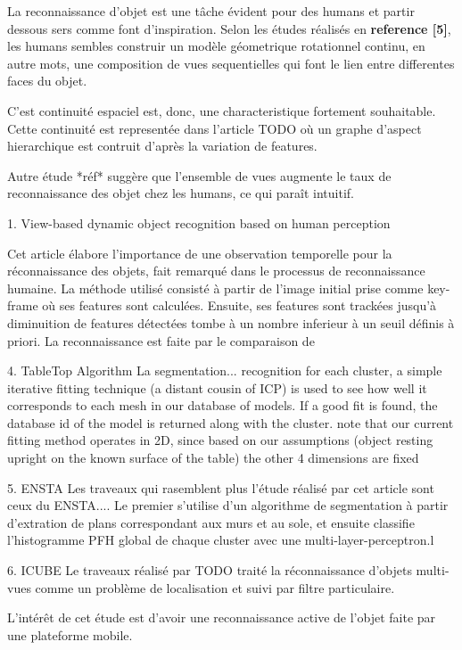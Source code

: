 La reconnaissance d'objet est une tâche évident pour des humans et partir dessous sers comme font d'inspiration.
Selon les études réalisés en \textbf{reference [5]}, les humans sembles construir un modèle géometrique rotationnel continu, en autre mots, une composition de vues sequentielles qui font le lien entre differentes faces du objet. 

C'est continuité espaciel est, donc, une characteristique fortement souhaitable. Cette continuité est representée dans l'article {\color{red} TODO} où un graphe d'aspect hierarchique est contruit d'après la variation de features. 

Autre étude *réf* suggère que l'ensemble de vues augmente le taux de reconnaissance des objet chez les humans, ce qui paraît intuitif.


1. View-based dynamic object recognition based on human perception 

Cet article élabore l'importance de une observation temporelle pour la réconnaissance des objets, fait remarqué dans le processus de reconnaissance humaine.
La méthode utilisé consisté à partir de l'image initial prise comme key-frame où ses features sont calculées. Ensuite, ses features sont trackées jusqu'à diminuition de features détectées tombe à un nombre inferieur à un seuil définis à priori. La reconnaissance est faite par le comparaison de 




4. TableTop Algorithm
La segmentation...
recognition
for each cluster, a simple iterative fitting technique (a distant cousin of ICP) is used to see how well it corresponds to each mesh in our database of models. If a good fit is found, the database id of the model is returned along with the cluster.
note that our current fitting method operates in 2D, since based on our assumptions (object resting upright on the known surface of the table) the other 4 dimensions are fixed

5. ENSTA 
Les traveaux qui rasemblent plus l'étude réalisé par cet article sont ceux du {\color{blue} ENSTA...}. Le premier s'utilise d'un algorithme de segmentation à partir d'extration de plans correspondant aux murs et au sole, et ensuite classifie l'histogramme PFH global de chaque cluster avec une multi-layer-perceptron.l

6. ICUBE
Le traveaux réalisé par {\color{blue} TODO } traité la réconnaissance d'objets multi-vues comme un problème de localisation et suivi par filtre particulaire. 


L'intérêt de cet étude est d'avoir une reconnaissance active de l'objet faite par une plateforme mobile.  

